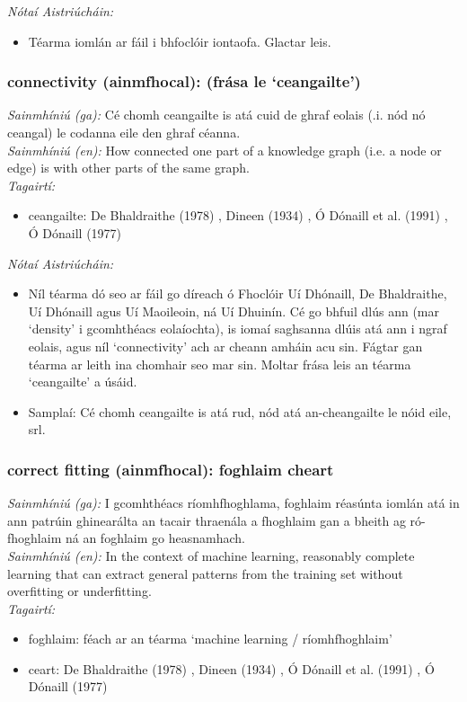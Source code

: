  \noindent \textit{Nótaí Aistriúcháin:}
\begin{itemize}
	\item Téarma iomlán ar fáil i bhfoclóir iontaofa. Glactar leis.
\end{itemize}


\subsubsection*{connectivity (ainmfhocal): (frása le `ceangailte')}
 \noindent \textit{Sainmhíniú (ga):} Cé chomh ceangailte is atá cuid de ghraf eolais (.i. nód nó ceangal) le codanna eile den ghraf céanna.
\\
 \noindent \textit{Sainmhíniú (en):} How connected one part of a knowledge graph (i.e. a node or edge) is with other parts of the same graph.
\\
 \noindent \textit{Tagairtí:}
\begin{itemize}
	\item ceangailte: De Bhaldraithe (1978) \cite{de-bhaldraithe}, Dineen (1934) \cite{dineen}, Ó Dónaill et al. (1991) \cite{focloir-beag}, Ó Dónaill (1977) \cite{odonaill}
\end{itemize}

 \noindent \textit{Nótaí Aistriúcháin:}
\begin{itemize}
	\item Níl téarma dó seo ar fáil go díreach ó Fhoclóir Uí Dhónaill, De Bhaldraithe, Uí Dhónaill agus Uí Maoileoin, ná Uí Dhuinín. Cé go bhfuil dlús ann (mar `density' i gcomhthéacs eolaíochta), is iomaí saghsanna dlúis atá ann i ngraf eolais, agus níl `connectivity' ach ar cheann amháin acu sin. Fágtar gan téarma ar leith ina chomhair seo mar sin. Moltar frása leis an téarma `ceangailte' a úsáid.
	\item Samplaí: Cé chomh ceangailte is atá rud, nód atá an-cheangailte le nóid eile, srl.
\end{itemize}


\subsubsection*{correct fitting (ainmfhocal): foghlaim cheart}
 \noindent \textit{Sainmhíniú (ga):} I gcomhthéacs ríomhfhoghlama, foghlaim réasúnta iomlán atá in ann patrúin ghinearálta an tacair thraenála a fhoghlaim gan a bheith ag ró-fhoghlaim ná an foghlaim go heasnamhach.
\\
 \noindent \textit{Sainmhíniú (en):} In the context of machine learning, reasonably complete learning that can extract general patterns from the training set without overfitting or underfitting.
\\
 \noindent \textit{Tagairtí:}
\begin{itemize}
	\item foghlaim: féach ar an téarma `machine learning / ríomhfhoghlaim'
	\item ceart: De Bhaldraithe (1978) \cite{de-bhaldraithe}, Dineen (1934) \cite{dineen}, Ó Dónaill et al. (1991) \cite{focloir-beag}, Ó Dónaill (1977) \cite{odonaill}
\end{itemize}

